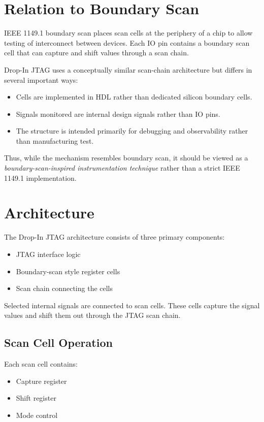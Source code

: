 \documentclass[10pt]{article}
\begin{document}
\section{Relation to Boundary Scan}

IEEE 1149.1 boundary scan places scan cells at the periphery of a chip to allow testing of interconnect between devices. Each IO pin contains a boundary scan cell that can capture and shift values through a scan chain.

Drop-In JTAG uses a conceptually similar scan-chain architecture but differs in several important ways:

\begin{itemize}
\item Cells are implemented in HDL rather than dedicated silicon boundary cells.
\item Signals monitored are internal design signals rather than IO pins.
\item The structure is intended primarily for debugging and observability rather than manufacturing test.
\end{itemize}

Thus, while the mechanism resembles boundary scan, it should be viewed as a \textit{boundary-scan-inspired instrumentation technique} rather than a strict IEEE 1149.1 implementation.

\section{Architecture}

The Drop-In JTAG architecture consists of three primary components:

\begin{itemize}
\item JTAG interface logic
\item Boundary-scan style register cells
\item Scan chain connecting the cells
\end{itemize}

Selected internal signals are connected to scan cells. These cells capture the signal values and shift them out through the JTAG scan chain.

\subsection{Scan Cell Operation}

Each scan cell contains:

\begin{itemize}
\item Capture register
\item Shift register
\item Mode control
\end{itemize}
\end{document}
